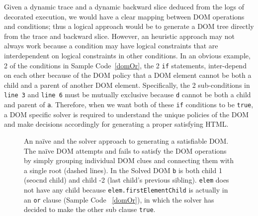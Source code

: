Given a dynamic trace and a dynamic backward slice deduced from the logs of decorated execution, we would have a clear mapping between DOM operations and conditions; 
thus a logical approach would be to generate a DOM tree directly from the trace and backward slice.  
However, an heuristic approach may not always work because a condition may have logical constraints that are interdependent on logical constraints in other conditions.  
In an obvious example, 2 of the conditions in Sample Code~\ref{domOr}, the 2 {\tt if} statements, inter-depend on each other because of the DOM policy that a DOM element cannot be both a child and a parent of another DOM element.  
Specifically, the 2 sub-conditions in {\tt line 3} and {\tt line 6} must be mutually exclusive because {\tt d} cannot be both a child and parent of {\tt a}.
Therefore, when we want both of these {\tt if} conditions to be {\tt true}, a DOM specific solver is required to understand the unique policies of the DOM and make decisions accordingly for generating a proper satisfying HTML.


\begin{figure}[ht]
\centerline{}
\caption[Naive vs. Solved DOM trees]{An na\"{i}ve and the solver approach to generating a satisfiable DOM.  The na\"{i}ve DOM attempts and fails to satisfy the DOM operations by simply grouping individual DOM clues and connecting them with a single root (dashed lines).  In the Solved DOM {\tt b} is both child 1 (seocnd child) and child -2 (last child's previous sibling).  {\tt elem} does not have any child because {\tt elem.firstElementChild} is actually in an {\tt or} clause (Sample Code ~\ref{domOr}), in which the solver has decided to make the other sub clause {\tt true}.}
\label{trees}
\end{figure}


